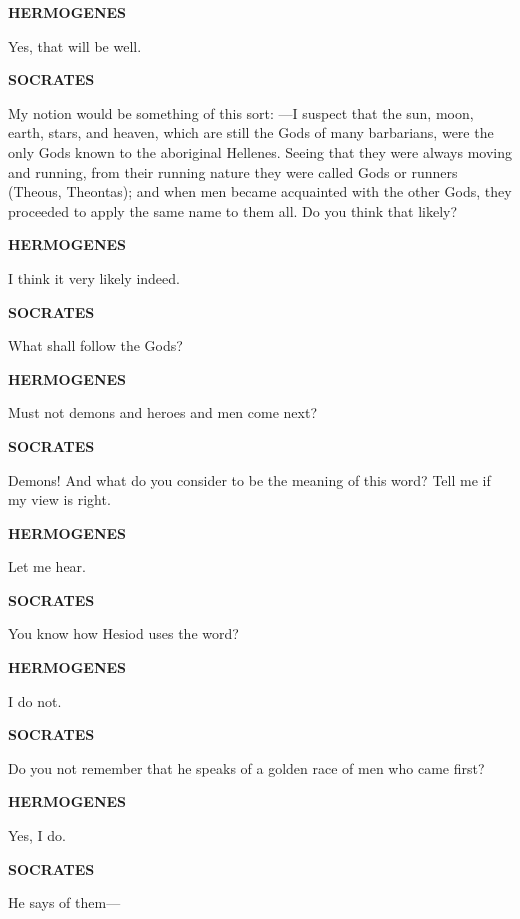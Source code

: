 \documentclass[11pt,letter]{article}
\begin{document}
\par \textbf{HERMOGENES}
\par   Yes, that will be well.

\par \textbf{SOCRATES}
\par   My notion would be something of this sort: —I suspect that the sun, moon, earth, stars, and heaven, which are still the Gods of many barbarians, were the only Gods known to the aboriginal Hellenes. Seeing that they were always moving and running, from their running nature they were called Gods or runners (Theous, Theontas); and when men became acquainted with the other Gods, they proceeded to apply the same name to them all. Do you think that likely?

\par \textbf{HERMOGENES}
\par   I think it very likely indeed.

\par \textbf{SOCRATES}
\par   What shall follow the Gods?

\par \textbf{HERMOGENES}
\par   Must not demons and heroes and men come next?

\par \textbf{SOCRATES}
\par   Demons! And what do you consider to be the meaning of this word? Tell me if my view is right.

\par \textbf{HERMOGENES}
\par   Let me hear.

\par \textbf{SOCRATES}
\par   You know how Hesiod uses the word?

\par \textbf{HERMOGENES}
\par   I do not.

\par \textbf{SOCRATES}
\par   Do you not remember that he speaks of a golden race of men who came first?

\par \textbf{HERMOGENES}
\par   Yes, I do.

\par \textbf{SOCRATES}
\par   He says of them—
\end{document}
